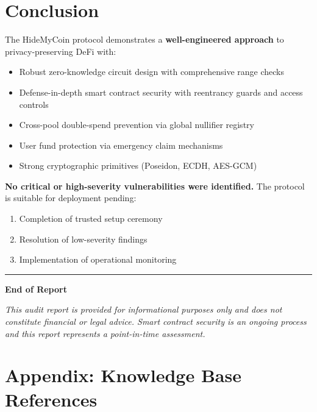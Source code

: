 \documentclass[11pt,a4paper]{article}
\begin{document}
\section{Conclusion}

The HideMyCoin protocol demonstrates a \textbf{well-engineered approach} to privacy-preserving DeFi with:

\begin{itemize}
    \item Robust zero-knowledge circuit design with comprehensive range checks
    \item Defense-in-depth smart contract security with reentrancy guards and access controls
    \item Cross-pool double-spend prevention via global nullifier registry
    \item User fund protection via emergency claim mechanisms
    \item Strong cryptographic primitives (Poseidon, ECDH, AES-GCM)
\end{itemize}

\textbf{No critical or high-severity vulnerabilities were identified.} The protocol is suitable for deployment pending:
\begin{enumerate}
    \item Completion of trusted setup ceremony
    \item Resolution of low-severity findings
    \item Implementation of operational monitoring
\end{enumerate}

\vspace{1cm}

\begin{center}
\rule{0.5\textwidth}{0.4pt}

\textbf{End of Report}

\textit{This audit report is provided for informational purposes only and does not constitute financial or legal advice. Smart contract security is an ongoing process and this report represents a point-in-time assessment.}
\end{center}

\appendix
\section{Appendix: Knowledge Base References}
\end{document}
